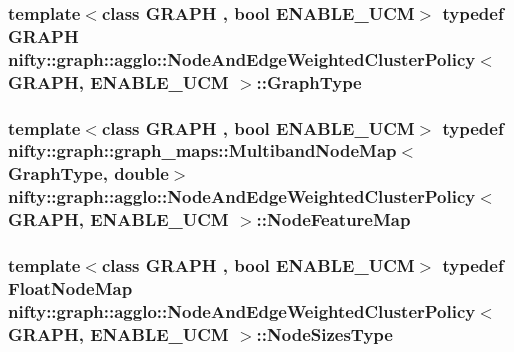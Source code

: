 \subsubsection[{Graph\+Type}]{\setlength{\rightskip}{0pt plus 5cm}template$<$class G\+R\+A\+P\+H , bool E\+N\+A\+B\+L\+E\+\_\+\+U\+C\+M$>$ typedef G\+R\+A\+P\+H {\bf nifty\+::graph\+::agglo\+::\+Node\+And\+Edge\+Weighted\+Cluster\+Policy}$<$ G\+R\+A\+P\+H, E\+N\+A\+B\+L\+E\+\_\+\+U\+C\+M $>$\+::{\bf Graph\+Type}}\label{classnifty_1_1graph_1_1agglo_1_1NodeAndEdgeWeightedClusterPolicy_a293d476ffc7b8513eeb20c21bfefb579}
\hypertarget{classnifty_1_1graph_1_1agglo_1_1NodeAndEdgeWeightedClusterPolicy_aa07dae5e9a8be0e547eb7d1e9921dd05}{}
\subsubsection[{Node\+Feature\+Map}]{\setlength{\rightskip}{0pt plus 5cm}template$<$class G\+R\+A\+P\+H , bool E\+N\+A\+B\+L\+E\+\_\+\+U\+C\+M$>$ typedef {\bf nifty\+::graph\+::graph\+\_\+maps\+::\+Multiband\+Node\+Map}$<${\bf Graph\+Type}, double$>$ {\bf nifty\+::graph\+::agglo\+::\+Node\+And\+Edge\+Weighted\+Cluster\+Policy}$<$ G\+R\+A\+P\+H, E\+N\+A\+B\+L\+E\+\_\+\+U\+C\+M $>$\+::{\bf Node\+Feature\+Map}}\label{classnifty_1_1graph_1_1agglo_1_1NodeAndEdgeWeightedClusterPolicy_aa07dae5e9a8be0e547eb7d1e9921dd05}
\hypertarget{classnifty_1_1graph_1_1agglo_1_1NodeAndEdgeWeightedClusterPolicy_a47dc2122410c8a113e4b14664be633c7}{}
\subsubsection[{Node\+Sizes\+Type}]{\setlength{\rightskip}{0pt plus 5cm}template$<$class G\+R\+A\+P\+H , bool E\+N\+A\+B\+L\+E\+\_\+\+U\+C\+M$>$ typedef {\bf Float\+Node\+Map} {\bf nifty\+::graph\+::agglo\+::\+Node\+And\+Edge\+Weighted\+Cluster\+Policy}$<$ G\+R\+A\+P\+H, E\+N\+A\+B\+L\+E\+\_\+\+U\+C\+M $>$\+::{\bf Node\+Sizes\+Type}}\label{classnifty_1_1graph_1_1agglo_1_1NodeAndEdgeWeightedClusterPolicy_a47dc2122410c8a113e4b14664be633c7}


